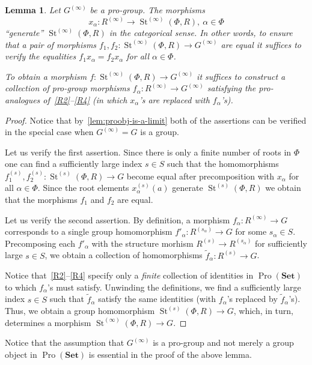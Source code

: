 \documentclass{article}
\numberwithin{equation}{section}
\newtheorem{lemma}{Lemma} \numberwithin{lemma}{section}
\theoremstyle{definition}
\theoremstyle{remark}
\DeclareMathOperator\St{St}
\DeclareMathOperator{\Pro}{Pro}
\newcommand{\Set}{\mathbf{Set}}
\begin{document}
\begin{lemma}\label{SteinbergPresentation}
Let \(G^{(\infty)}\) be a pro-group. The morphisms \[x_{\alpha} \colon R^{(\infty)} \to \St^{(\infty)}(\Phi, R), \ \alpha\in \Phi\] ``generate'' $\St^{(\infty)}(\Phi, R)$ in the categorical sense. In other words, to ensure that a pair of morphisms $f_1,f_2\colon\St^{(\infty)}(\Phi, R) \to G^{(\infty)}$ are equal it suffices to verify the equalities $f_1 x_{\alpha} = f_2 x_\alpha$ for all $\alpha\in\Phi$.

To obtain a morphism $f \colon \St^{(\infty)}(\Phi, R) \to G^{(\infty)}$ it suffices to construct a collection of pro-group morphisms \(f_{\alpha} \colon R^{(\infty)} \to G^{(\infty)}\) satisfying the pro-analogues of~\eqref{R2}--\eqref{R4} (in which $x_\alpha$'s are replaced with $f_{\alpha}$'s).
\end{lemma}
\begin{proof}
Notice that by~\cref{lem:proobj-is-a-limit} both of the assertions can be verified in the special case when $G^{(\infty)} = G$ is a group.

Let us verify the first assertion. Since there is only a finite number of roots in $\Phi$ one can find a sufficiently large index $s \in S$ such that the homomorphisms $f_1^{(s)}, f_2^{(s)}\colon \St^{(s)}(\Phi, R) \to G$ become equal after precomposition with $x_\alpha$ for all $\alpha \in \Phi$.
Since the root elements $x_\alpha^{(s)}(a)$ generate $\St^{(s)}(\Phi, R)$ we obtain that the morphisms $f_1$ and $f_2$ are equal.

Let us verify the second assertion. By definition, a morphism $f_\alpha \colon R^{(\infty)} \to G$ corresponds to a single group homomorphism 
 $f'_\alpha \colon R^{(s_\alpha)} \to G$ for some $s_\alpha \in S$. Precomposing each $f'_\alpha$ with the structure morhism $R^{(s)} \to R^{(s_\alpha)}$ for sufficiently large $s \in S$, we obtain a collection of homomorphisms $\widetilde{f}_\alpha \colon R^{(s)} \to G$.
 
Notice that~\eqref{R2}--\eqref{R4} specify only a {\it finite} collection of identities in $\Pro(\Set)$ to which $f_\alpha$'s must satisfy.
Unwinding the definitions, we find a sufficiently large index $s \in S$ such that $\widetilde{f}_\alpha$ satisfy the same identities (with $f_\alpha$'s replaced by $\widetilde{f}_\alpha$'s).
Thus, we obtain a group homomorphism $\St^{(s)}(\Phi, R) \to G$, which, in turn, determines a morphism $\St^{(\infty)}(\Phi, R) \to G$.
\end{proof}
Notice that the assumption that $G^{(\infty)}$ is a pro-group and not merely a group object in $\Pro(\Set)$ is essential in the proof of the above lemma.
\end{document}
